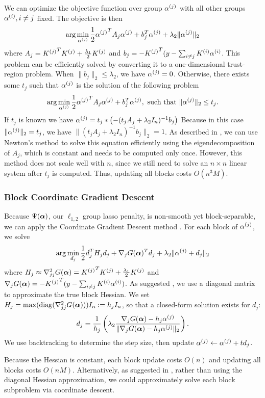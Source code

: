 We can optimize the objective function over group ${\alpha^{(j)}}$ with all other groups
${\alpha^{(i)}}, i \ne j$ fixed. The objective is then
\[
\arg\min_{\alpha^{(j)}} \frac{1}{2}{\alpha^{(j)}}^T A_j {\alpha^{(j)}} + b_j^T {\alpha^{(j)}} + \lambda_2 \|{\alpha^{(j)}}\|_2
\]
where $A_j = {K^{(j)}}^T {K^{(j)}} + \frac{\lambda_1}{2}{K^{(j)}}$ 
and $b_j = -{K^{(j)}}^T (y-\sum_{i\ne j}{{K^{(i)}} {\alpha^{(i)}}}$.
This problem can be efficiently solved \citep{bcd-group-lasso:2013} 
by converting it to a one-dimensional trust-region problem. 
When $\|b_j\|_2 \le \lambda_2$, we have ${\alpha^{(j)}} = 0$. 
Otherwise, there exists some $t_j$ such that ${\alpha^{(j)}}$ is the solution of the following
problem
\[
\arg\min_{\alpha^{(j)}} \frac{1}{2}{\alpha^{(j)}}^T A_j {\alpha^{(j)}} + b_j^T {\alpha^{(j)}}, 
\text{ such that } \|{\alpha^{(j)}}\|_2 \le t_j.
\]
If $t_j$ is known we have ${\alpha^{(j)}} = t_j * \left(-(t_j A_j + \lambda_2 I_n)^{-1} b_j\right)$
Because in this case $\|{\alpha^{(j)}}\|_2 = t_j$, we have $\|(t_j A_j + \lambda_2 I_n)^{-1} b_j\|_2 = 1$.
As described in \citet{bcd-group-lasso:2013}, 
we can use Newton's method to solve this equation efficiently 
using the eigendecomposition of $A_j$, which is constant and needs to be computed only once.
However, this method does not scale well with $n$, since we still need
to solve an $n \times n$ linear system after $t_j$ is computed.
Thus, updating all blocks costs $O(n^3 M)$.

\subsubsection*{Block Coordinate Gradient Descent}

Because $\Psi({\bm{\alpha}})$, our $\ell_{1,2}$ group lasso penalty, is non-smooth yet block-separable,
we can apply the Coordinate Gradient Descent method \citep{cgd:2009}.
For each block of ${\alpha^{(j)}}$, we solve
\[
\arg\min_{d_j} \frac{1}{2}d_j^T H_j d_j + \nabla_{j}G({\bm{\alpha}})^T d_j 
+ \lambda_2 \|{\alpha^{(j)}}+d_j\|_2
\]
where $H_j \approx \nabla^2_{jj}G({\bm{\alpha}}) = {K^{(j)}}^T {K^{(j)}} + \frac{\lambda_1}{2}{K^{(j)}}$ 
and $\nabla_j G({\bm{\alpha}}) = -{K^{(j)}}^T (y-\sum_{i\ne j}{{K^{(i)}} {\alpha^{(i)}}})$.
As suggested \citet{cgd:2009}, we use a diagonal matrix to approximate the true block Hessian.
We set $H_j = \max({\rm diag}(\nabla^2_{jj}G({\bm{\alpha}}))) I_n := h_j I_n$, so that a closed-form solution exists
for $d_j$:
\[
d_j = \frac{1}{h_j}\left(\lambda_2 \frac{\nabla_j G({\bm{\alpha}}) - h_j {\alpha^{(j)}}}
{\|\nabla_j G({\bm{\alpha}}) - h_j {\alpha^{(j)}}\|_2}\right).
\]
We use backtracking to determine the step size, then update ${\alpha^{(j)}} \leftarrow {\alpha^{(j)}} + t d_j$.

Because the Hessian is constant, each block update costs $O(n)$ and updating all blocks costs $O(nM)$.
Alternatively, as suggested in \citet{note-group-lasso:2010}, rather than using the 
diagonal Hessian approximation, we could approximately solve each block subproblem via 
coordinate descent.

